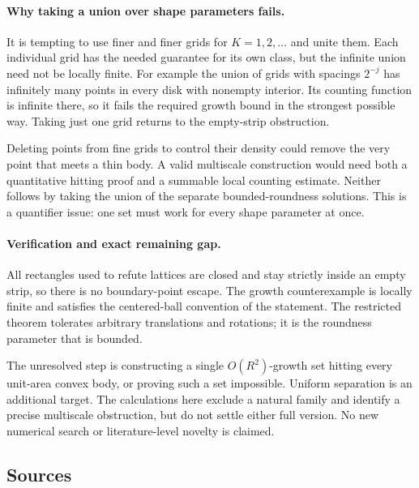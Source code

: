 \documentclass[11pt,a4paper]{article}
\begin{document}
\paragraph{Why taking a union over shape parameters fails.}
It is tempting to use finer and finer grids for $K=1,2,\ldots$ and unite them. Each individual grid has the needed guarantee for its own class, but the infinite union need not be locally finite. For example the union of grids with spacings $2^{-j}$ has infinitely many points in every disk with nonempty interior. Its counting function is infinite there, so it fails the required growth bound in the strongest possible way. Taking just one grid returns to the empty-strip obstruction.

Deleting points from fine grids to control their density could remove the very point that meets a thin body. A valid multiscale construction would need both a quantitative hitting proof and a summable local counting estimate. Neither follows by taking the union of the separate bounded-roundness solutions. This is a quantifier issue: one set must work for every shape parameter at once.

\paragraph{Verification and exact remaining gap.}
All rectangles used to refute lattices are closed and stay strictly inside an empty strip, so there is no boundary-point escape. The growth counterexample is locally finite and satisfies the centered-ball convention of the statement. The restricted theorem tolerates arbitrary translations and rotations; it is the roundness parameter that is bounded.

The unresolved step is constructing a single $O(R^2)$-growth set hitting every unit-area convex body, or proving such a set impossible. Uniform separation is an additional target. The calculations here exclude a natural family and identify a precise multiscale obstruction, but do not settle either full version. No new numerical search or literature-level novelty is claimed.

\subsection{Sources}
\end{document}
